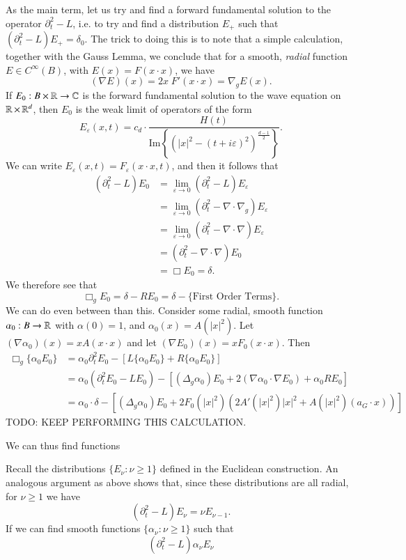 As the main term, let us try and find a forward fundamental solution to the operator $\partial_t^2 - L$, i.e. to try and find a distribution $E_+$ such that $(\partial_t^2 - L) E_+ = \delta_0$. The trick to doing this is to note that a simple calculation, together with the Gauss Lemma, we conclude that for a smooth, \emph{radial} function $E \in C^\infty(B)$, with $E(x) = F(x \cdot x)$, we have
%
\[ (\nabla E)(x) = 2 x\; F'(x \cdot x) = \nabla_g E(x). \]
%
If $E_0: B \times \operatorname{\mathbb{R}} \to \operatorname{\mathbb{C}}$ is the forward fundamental solution to the wave equation on $\operatorname{\mathbb{R}} \times \operatorname{\mathbb{R}}^d$, then $E_0$ is the weak limit of operators of the form
%
\[ E_\varepsilon(x,t) = c_d \cdot \frac{H(t)}{\text{Im} \left\{ \left(|x|^2 - (t + i \varepsilon)^2 \right)^{\frac{d-1}{2}} \right\}}. \]
%
We can write $E_\varepsilon(x,t) = F_\varepsilon(x \cdot x,t)$, and then it follows that
%
\begin{align*}
    (\partial_t^2 - L) E_0 &= \lim_{\varepsilon \to 0} (\partial_t^2 - L) E_\varepsilon\\
    &= \lim_{\varepsilon \to 0} (\partial_t^2 - \nabla \cdot \nabla_g) E_\varepsilon\\
    &= \lim_{\varepsilon \to 0} (\partial_t^2 - \nabla \cdot \nabla) E_\varepsilon\\
    &= (\partial_t^2 - \nabla \cdot \nabla) E_0\\
    &= \Box E_0 = \delta.
\end{align*}
%
We therefore see that
%
\[ \Box_g E_0 = \delta - R E_0 = \delta - \Big\{ \text{First Order Terms} \Big\}. \]
%
We can do even between than this. Consider some radial, smooth function $\alpha_0: B \to \operatorname{\mathbb{R}}$ with $\alpha(0) = 1$, and $\alpha_0(x) = A(|x|^2)$. Let $(\nabla \alpha_0)(x) = x A(x \cdot x)$ and let $(\nabla E_0)(x) = x F_0(x \cdot x)$. Then
%
\begin{align*}
    \Box_g \{ \alpha_0 E_0 \} &= \alpha_0 \partial_t^2 E_0 - \left[ L \{ \alpha_0 E_0 \} + R \{ \alpha_0 E_0 \} \right]\\
    &= \alpha_0 (\partial_t^2 E_0 - L E_0) - \left[ (\Delta_g \alpha_0) E_0 + 2 (\nabla \alpha_0 \cdot \nabla E_0) + \alpha_0 R E_0 \right]\\
    &= \alpha_0 \cdot \delta - [ (\Delta_g \alpha_0) E_0 + 2 F_0(|x|^2) \left( 2 A'(|x|^2) |x|^2 + A(|x|^2) (a_G \cdot x) \right) ] 
\end{align*}
%
TODO: KEEP PERFORMING THIS CALCULATION.

We can thus find functions


Recall the distributions $\{ E_\nu : \nu \geq 1 \}$ defined in the Euclidean construction. An analogous argument as above shows that, since these distributions are all radial, for $\nu \geq 1$ we have
%
\[ (\partial_t^2 - L) E_\nu = \nu E_{\nu - 1}. \]
%
If we can find smooth functions $\{ \alpha_\nu : \nu \geq 1 \}$ such that
%
\[ (\partial_t^2 - L) \alpha_\nu E_\nu \]



